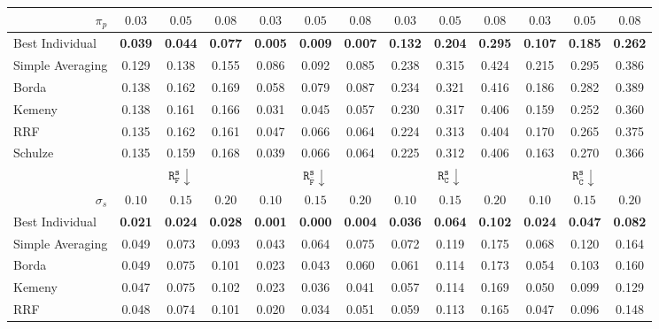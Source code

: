 \begin{table}[!ht]
\begin{tabular}{|l||c|c|c||c|c|c||c|c|c||c|c|c|}
\cline{2-13}
\multicolumn{1}{|r||}{$\pi_p$} & $0.03$ & $0.05$ & $0.08$ & $0.03$ & $0.05$ & $0.08$ & $0.03$ & $0.05$ & $0.08$ & $0.03$ & $0.05$ & $0.08$ \\
\hline
\hline
Best Individual & \textbf{0.039} & \textbf{0.044} & \textbf{0.077} & \textbf{0.005} & \textbf{0.009} & \textbf{0.007} & \textbf{0.132} & \textbf{0.204} & \textbf{0.295} & \textbf{0.107} & \textbf{0.185} & \textbf{0.262} \\
\hline
Simple Averaging & 0.129 & 0.138 & 0.155 & 0.086 & 0.092 & 0.085 & 0.238 & 0.315 & 0.424 & 0.215 & 0.295 & 0.386 \\
\hline
Borda & 0.138 & 0.162 & 0.169 & 0.058 & 0.079 & 0.087 & 0.234 & 0.321 & 0.416 & 0.186 & 0.282 & 0.389 \\
Kemeny & 0.138 & 0.161 & 0.166 & 0.031 & 0.045 & 0.057 & 0.230 & 0.317 & 0.406 & 0.159 & 0.252 & 0.360 \\
RRF & 0.135 & 0.162 & 0.161 & 0.047 & 0.066 & 0.064 & 0.224 & 0.313 & 0.404 & 0.170 & 0.265 & 0.375 \\
Schulze & 0.135 & 0.159 & 0.168 & 0.039 & 0.066 & 0.064 & 0.225 & 0.312 & 0.406 & 0.163 & 0.270 & 0.366 \\
\hline
\hline
& \multicolumn{3}{c||}{$\mathtt{R}_{\mathtt{F}}^{\mathtt{s}}\downarrow$} & \multicolumn{3}{c||}{$\mathtt{R}_{\bar{\mathtt{F}}}^{\mathtt{s}}\downarrow$} & \multicolumn{3}{c||}{$\mathtt{R}_{\mathtt{C}}^{\mathtt{s}}\downarrow$} & \multicolumn{3}{c|}{$\mathtt{R}_{\bar{\mathtt{C}}}^{\mathtt{s}}\downarrow$} \\
\cline{2-13}
\multicolumn{1}{|r||}{$\sigma_s$} & $0.10$ & $0.15$ & $0.20$ & $0.10$ & $0.15$ & $0.20$ & $0.10$ & $0.15$ & $0.20$ & $0.10$ & $0.15$ & $0.20$ \\
\hline
\hline
Best Individual & \textbf{0.021} & \textbf{0.024} & \textbf{0.028} & \textbf{0.001} & \textbf{0.000} & \textbf{0.004} & \textbf{0.036} & \textbf{0.064} & \textbf{0.102} & \textbf{0.024} & \textbf{0.047} & \textbf{0.082} \\
\hline
Simple Averaging & 0.049 & 0.073 & 0.093 & 0.043 & 0.064 & 0.075 & 0.072 & 0.119 & 0.175 & 0.068 & 0.120 & 0.164 \\
\hline
Borda & 0.049 & 0.075 & 0.101 & 0.023 & 0.043 & 0.060 & 0.061 & 0.114 & 0.173 & 0.054 & 0.103 & 0.160 \\
Kemeny & 0.047 & 0.075 & 0.102 & 0.023 & 0.036 & 0.041 & 0.057 & 0.114 & 0.169 & 0.050 & 0.099 & 0.129 \\
RRF & 0.048 & 0.074 & 0.101 & 0.020 & 0.034 & 0.051 & 0.059 & 0.113 & 0.165 & 0.047 & 0.096 & 0.148 \\

\end{tabular}
\end{table}
